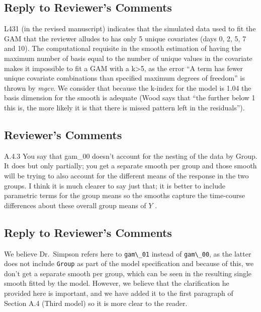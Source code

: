 \documentclass[
]{article}
\newcommand{\passthrough}[1]{#1}
\begin{document}
\hypertarget{section-10}{%
\subsection{\texorpdfstring{\textcolor{reviewersblue} {Reply to Reviewer's Comments}}{}}\label{section-10}}

L431 (in the revised manuscript) indicates that the simulated data used to fit the GAM that the reviewer alludes to has only 5 unique covariates (days 0, 2, 5, 7 and 10). The computational requisite in the smooth estimation of having the maximum number of basis equal to the number of unique values in the covariate makes it impossible to fit a GAM with a k\textgreater5, as the error ``A term has fewer unique covariate combinations than specified maximum degrees of freedom'' is thrown by \emph{mgcv}. We consider that because the k-index for the model is 1.04 the basis dimension for the smooth is adequate (Wood says that ``the further below 1 this is, the more likely it is that there is missed pattern left in the residuals'').

\hypertarget{reviewers-comments-10}{%
\subsection{Reviewer's Comments}\label{reviewers-comments-10}}

A.4.3 You say that gam\_00 doesn't account for the nesting of the data by Group. It does but only partially; you get a separate smooth per group and those smooth will be trying to also account for the different means of the response in the two groups. I think it is much clearer to say just that; it is better to include
parametric terms for the group means so the smooths capture the time-course differences about these overall group means of \(Y\) .

\hypertarget{section-11}{%
\subsection{\texorpdfstring{\textcolor{reviewersblue} {Reply to Reviewer's Comments}}{}}\label{section-11}}

We believe Dr.~Simpson refers here to \passthrough{\lstinline!gam\_01!} instead of \passthrough{\lstinline!gam\_00!}, as the latter does not include \passthrough{\lstinline!Group!} as part of the model specification and because of this, we don't get a separate smooth per group, which can be seen in the resulting single smooth fitted by the model. However, we believe that the clarification he provided here is important, and we have added it to the first paragraph of Section A.4 (Third model) so it is more clear to the reader.
\end{document}

